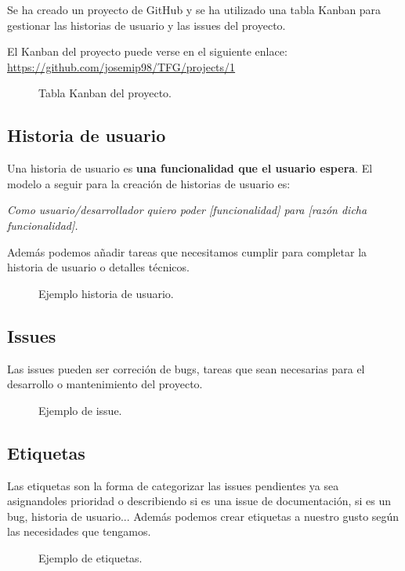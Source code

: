 Se ha creado un proyecto de GitHub y se ha utilizado una tabla Kanban para gestionar las historias de usuario y las issues del proyecto.

El Kanban del proyecto puede verse en el siguiente enlace:
\url{https://github.com/josemip98/TFG/projects/1}

\begin{figure}[H]
  	\centering
  	\noindent{}
  	\caption{Tabla Kanban del proyecto.}
	\end{figure}

\subsection{Historia de usuario}
Una historia de usuario es \textbf{una funcionalidad que el usuario espera}.
El modelo a seguir para la creación de historias de usuario es:

\textit{Como usuario/desarrollador quiero poder [funcionalidad] para [razón dicha funcionalidad].}

Además podemos añadir tareas que necesitamos cumplir para completar la historia de usuario o detalles técnicos.

\begin{figure}[H]
	\centering
	\noindent{}
	\caption{Ejemplo historia de usuario.}
  	\end{figure}

\subsection{Issues}
Las issues pueden ser correción de bugs, tareas que sean necesarias para el desarrollo o mantenimiento del proyecto.

\begin{figure}[H]
	\centering
	\noindent{}
	\caption{Ejemplo de issue.}
  	\end{figure}

\subsection{Etiquetas}

Las etiquetas son la forma de categorizar las issues pendientes ya sea asignandoles prioridad o describiendo si es una issue de documentación, si es un bug, historia de usuario...
Además podemos crear etiquetas a nuestro gusto según las necesidades que tengamos.

\begin{figure}[H]
	\centering
	\noindent{}
	\caption{Ejemplo de etiquetas.}
	\end{figure}